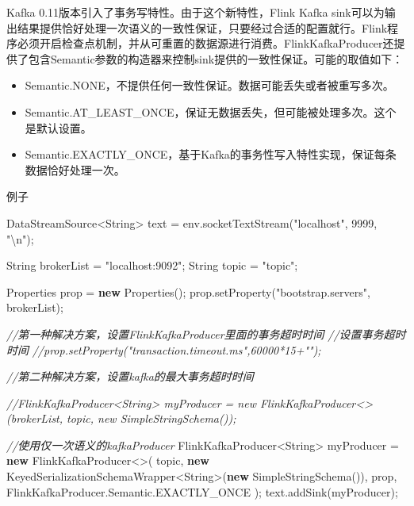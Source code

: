 \documentclass[cn,11pt,chinese]{elegantbook}
\newenvironment{Shaded}{}{}
\newcommand{\BuiltInTok}[1]{#1}
\newcommand{\CommentTok}[1]{\textcolor[rgb]{0.38,0.63,0.69}{\textit{#1}}}
\newcommand{\DecValTok}[1]{\textcolor[rgb]{0.25,0.63,0.44}{#1}}
\newcommand{\FunctionTok}[1]{\textcolor[rgb]{0.02,0.16,0.49}{#1}}
\newcommand{\KeywordTok}[1]{\textcolor[rgb]{0.00,0.44,0.13}{\textbf{#1}}}
\newcommand{\NormalTok}[1]{#1}
\newcommand{\SpecialCharTok}[1]{\textcolor[rgb]{0.25,0.44,0.63}{#1}}
\newcommand{\StringTok}[1]{\textcolor[rgb]{0.25,0.44,0.63}{#1}}
\providecommand{\tightlist}{%
  \setlength{\itemsep}{0pt}\setlength{\parskip}{0pt}}
\begin{document}
Kafka 0.11版本引入了事务写特性。由于这个新特性，Flink Kafka
sink可以为输出结果提供恰好处理一次语义的一致性保证，只要经过合适的配置就行。Flink程序必须开启检查点机制，并从可重置的数据源进行消费。FlinkKafkaProducer还提供了包含Semantic参数的构造器来控制sink提供的一致性保证。可能的取值如下：

\begin{itemize}
\tightlist
\item
  Semantic.NONE，不提供任何一致性保证。数据可能丢失或者被重写多次。
\item
  Semantic.AT\_LEAST\_ONCE，保证无数据丢失，但可能被处理多次。这个是默认设置。
\item
  Semantic.EXACTLY\_ONCE，基于Kafka的事务性写入特性实现，保证每条数据恰好处理一次。
\end{itemize}

例子

\begin{Shaded}
\begin{Highlighting}[]
\NormalTok{DataStreamSource\textless{}}\BuiltInTok{String}\NormalTok{\textgreater{} text = env.}\FunctionTok{socketTextStream}\NormalTok{(}\StringTok{"localhost"}\NormalTok{, }\DecValTok{9999}\NormalTok{, }\StringTok{"}\SpecialCharTok{\textbackslash{}n}\StringTok{"}\NormalTok{);}

\BuiltInTok{String}\NormalTok{ brokerList = }\StringTok{"localhost:9092"}\NormalTok{;}
\BuiltInTok{String}\NormalTok{ topic = }\StringTok{"topic"}\NormalTok{;}

\BuiltInTok{Properties}\NormalTok{ prop = }\KeywordTok{new} \BuiltInTok{Properties}\NormalTok{();}
\NormalTok{prop.}\FunctionTok{setProperty}\NormalTok{(}\StringTok{"bootstrap.servers"}\NormalTok{, brokerList);}

\CommentTok{//第一种解决方案，设置FlinkKafkaProducer里面的事务超时时间}
\CommentTok{//设置事务超时时间}
\CommentTok{//prop.setProperty("transaction.timeout.ms",60000*15+"");}

\CommentTok{//第二种解决方案，设置kafka的最大事务超时时间}

\CommentTok{//FlinkKafkaProducer\textless{}String\textgreater{} myProducer = new FlinkKafkaProducer\textless{}\textgreater{}(brokerList, topic, new SimpleStringSchema());}

\CommentTok{//使用仅一次语义的kafkaProducer}
\NormalTok{FlinkKafkaProducer\textless{}}\BuiltInTok{String}\NormalTok{\textgreater{} myProducer = }\KeywordTok{new}\NormalTok{ FlinkKafkaProducer\textless{}\textgreater{}(}
\NormalTok{    topic,}
    \KeywordTok{new}\NormalTok{ KeyedSerializationSchemaWrapper\textless{}}\BuiltInTok{String}\NormalTok{\textgreater{}(}\KeywordTok{new} \FunctionTok{SimpleStringSchema}\NormalTok{()),}
\NormalTok{    prop,}
\NormalTok{    FlinkKafkaProducer.}\FunctionTok{Semantic}\NormalTok{.}\FunctionTok{EXACTLY\_ONCE}
\NormalTok{);}
\NormalTok{text.}\FunctionTok{addSink}\NormalTok{(myProducer);}
\end{Highlighting}
\end{Shaded}
\end{document}
